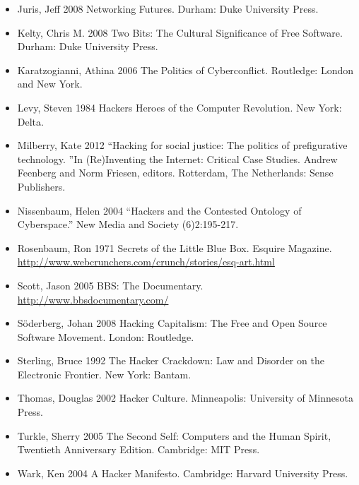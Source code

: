 \documentclass[letterpaper,12pt,english]{sphinxmanual}
\begin{document}
\begin{itemize}
\item {} 
Juris, Jeff 2008 Networking Futures. Durham: Duke University Press.

\item {} 
Kelty, Chris M. 2008 Two Bits: The Cultural Significance of Free Software. Durham: Duke University Press.

\item {} 
Karatzogianni, Athina 2006 The Politics of Cyberconflict. Routledge: London and New York.

\item {} 
Levy, Steven 1984 Hackers Heroes of the Computer Revolution. New York: Delta.

\item {} 
Milberry, Kate 2012 “Hacking for social justice: The politics of prefigurative technology. ”In (Re)Inventing the Internet: Critical Case Studies. Andrew Feenberg and Norm Friesen, editors. Rotterdam, The Netherlands: Sense Publishers.

\item {} 
Nissenbaum, Helen 2004 “Hackers and the Contested Ontology of Cyberspace.” New Media and Society (6)2:195-217.

\item {} 
Rosenbaum, Ron 1971 Secrets of the Little Blue Box. Esquire Magazine. \href{http://www.webcrunchers.com/crunch/stories/esq-art.html}{http://www.webcrunchers.com/crunch/stories/esq-art.html}

\item {} 
Scott, Jason 2005 BBS: The Documentary. \href{http://www.bbsdocumentary.com/}{http://www.bbsdocumentary.com/}

\item {} 
Söderberg, Johan 2008 Hacking Capitalism: The Free and Open Source Software Movement. London: Routledge.

\item {} 
Sterling, Bruce 1992 The Hacker Crackdown: Law and Disorder on the Electronic Frontier. New York: Bantam.

\item {} 
Thomas, Douglas 2002 Hacker Culture. Minneapolis: University of Minnesota Press.

\item {} 
Turkle, Sherry 2005 The Second Self: Computers and the Human Spirit, Twentieth Anniversary Edition. Cambridge: MIT Press.

\item {} 
Wark, Ken 2004 A Hacker Manifesto. Cambridge: Harvard University Press.

\end{itemize}
\end{document}
